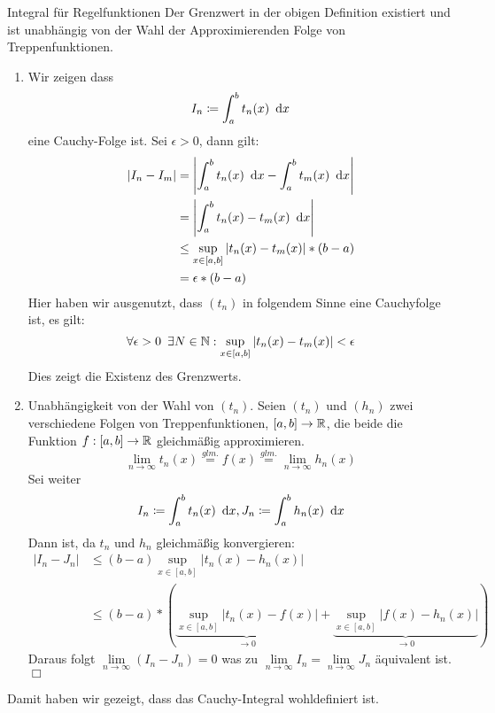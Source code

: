 \begin{lemma}{Integral für Regelfunktionen}
	Der Grenzwert in der obigen Definition existiert und ist unabhängig von der Wahl der Approximierenden Folge von Treppenfunktionen.
\end{lemma}

\begin{beweis}{}
	\begin{enumerate}
		\item Wir zeigen dass
		\begin{equation*}
			I_n\coloneqq \int_a^b t_n(x)\ \operatorname{d}\! x
		\end{equation*}
		eine Cauchy-Folge ist. Sei $\epsilon>0$, dann gilt:
		\begin{align*}
			|I_n-I_m|&=\left|\int_a^b t_n(x)\ \operatorname{d}\! x-\int_a^b t_m(x)\ \operatorname{d}\! x\right|\\
			&=\left|\int_a^b t_n(x)-t_m(x)\ \operatorname{d}\! x\right|\\
			&\leq \sup_{x\in[a,b]}|t_n(x)-t_m(x)|*(b-a)\\
			&=\epsilon*(b-a)
		\end{align*}
		Hier haben wir ausgenutzt, dass $(t_n)$ in folgendem Sinne eine Cauchyfolge ist, es gilt:
		\begin{equation*}
			\forall \epsilon>0 \enspace\exists N\in\mathbb{N}:\sup_{x\in[a,b]}|t_n(x)-t_m(x)|<\epsilon
		\end{equation*}
		Dies zeigt die Existenz des Grenzwerts.
		\item Unabhängigkeit von der Wahl von $(t_n)$. Seien $(t_n)$ und $(h_n)$ zwei verschiedene Folgen von Treppenfunktionen, $[a,b]\rightarrow\mathbb{R}$, die beide die Funktion $f:[a,b]\rightarrow\mathbb{R}$ gleichmäßig approximieren.
		\begin{equation*}
			\lim\limits_{n\to\infty}t_n(x)\overset{glm.}=f(x)\overset{glm.}=\lim\limits_{n\to\infty}h_n(x)
		\end{equation*}
		Sei weiter
		\begin{equation*}
			I_n\coloneqq \int_a^b t_n(x)\ \operatorname{d}\! x, J_n\coloneqq \int_a^b h_n(x)\ \operatorname{d}\! x
		\end{equation*}
		Dann ist, da $t_n$ und $h_n$ gleichmäßig konvergieren:
		\begin{align*}
			|I_n-J_n|&\leq (b-a)\sup_{x\in[a,b]}\left|t_n(x)-h_n(x)\right|\\
			&\leq (b-a)*\left(\underbrace{\sup_{x\in[a,b]}\left|t_n(x)-f(x)\right|}_{\to0}+\underbrace{\sup_{x\in[a,b]}\left|f(x)-h_n(x)\right|}_{\to0}\right)
		\end{align*}
		Daraus folgt $\lim\limits_{n\to\infty}(I_n-J_n)=0$ was zu $\lim\limits_{n\to\infty}I_n=\lim\limits_{n\to\infty}J_n$ äquivalent ist. \hfill$\Box$
	\end{enumerate}
\end{beweis}
Damit haben wir gezeigt, dass das Cauchy-Integral wohldefiniert ist.


